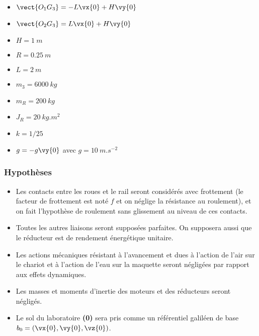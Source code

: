 \begin{multicols}{3}
\begin{itemize}
     \item $\vect{O_1 G_3} =-L\vx{0}+H\vy{0}$
     \item $\vect{O_2 G_3} =L\vx{0}+H\vy{0}$
     \item $H=\SI{1}{m}$
     \item $R=\SI{0,25}{m}$
     \item $L=\SI{2}{m}$
     \item $m_3=\SI{6000}{kg}$
     \item $m_R=\SI{200}{kg}$
     \item $J_R=\SI{20}{kg.m^2}$
     \item $k=1/25$
     \item $g=-g\vy{0}$ avec $g=\SI{10}{m.s^{-2}}$
\end{itemize} 
\end{multicols}

\subsubsection*{Hypothèses}
\begin{itemize}
    \item Les contacts entre les roues et le rail seront considérés avec frottement (le facteur de frottement est noté $f$ et on néglige la résistance au roulement), et on fait l'hypothèse de roulement sans glissement au niveau de ces contacts.
    \item Toutes les autres liaisons seront supposées parfaites. On supposera aussi que le réducteur est de rendement énergétique unitaire.
    \item Les actions mécaniques résistant à l'avancement et dues à l'action de l'air sur le chariot et à l'action de l'eau sur la maquette seront négligées par rapport aux effets dynamiques.
    \item Les masses et moments d’inertie des moteurs et des réducteurs seront négligés.
    \item Le sol du laboratoire \textbf{(0)} sera pris comme un référentiel galiléen de base $b_0=\left(\vx{0},\vy{0},\vz{0}\right)$.
\end{itemize}
